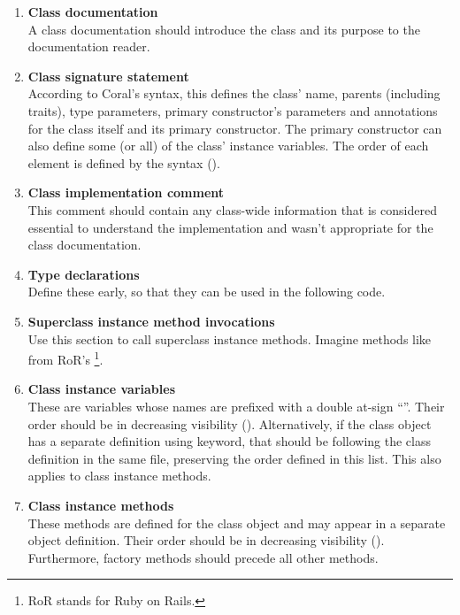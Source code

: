 \begin{enumerate}
\item {\bfseries Class documentation} \hfill \\
A class documentation should introduce the class and its purpose to the documentation reader. 

\item {\bfseries Class signature statement} \hfill \\
According to Coral's syntax, this defines the class' name, parents (including traits), type parameters, primary constructor's parameters and annotations for the class itself and its primary constructor. The primary constructor can also define some (or all) of the class' instance variables. The order of each element is defined by the syntax (). 

\item {\bfseries Class implementation comment} \hfill \\
This comment should contain any class-wide information that is considered essential to understand the implementation and wasn't appropriate for the class documentation. 

\item {\bfseries Type declarations} \hfill \\
Define these early, so that they can be used in the following code. 

\item {\bfseries Superclass instance method invocations} \hfill \\
Use this section to call superclass instance methods. Imagine methods like  from RoR's \footnote{RoR stands for Ruby on Rails.}. 

\item {\bfseries Class instance variables} \hfill \\
These are variables whose names are prefixed with a double at-sign ``''. Their order should be in decreasing visibility (). Alternatively, if the class object has a separate definition using  keyword, that should be following the class definition in the same file, preserving the order defined in this list. This also applies to class instance methods. 

\item {\bfseries Class instance methods} \hfill \\
These methods are defined for the class object and may appear in a separate object definition. Their order should be in decreasing visibility (). Furthermore, factory methods should precede all other methods. 


\end{enumerate}
